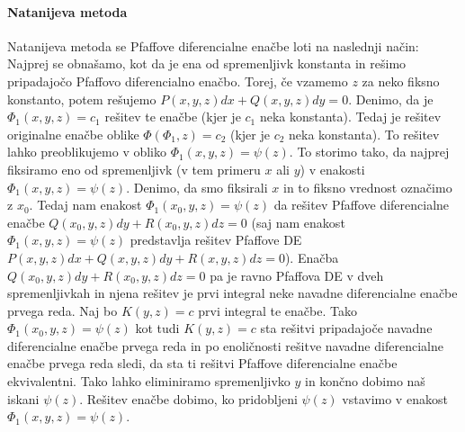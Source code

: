 \documentclass[a4paper, 10pt]{article}
\begin{document}
					\paragraph{Natanijeva metoda}
						Natanijeva metoda se Pfaffove diferencialne enačbe loti na naslednji način: Najprej se obnašamo, kot da je ena od spremenljivk konstanta in rešimo pripadajočo Pfaffovo diferencialno enačbo. Torej, če vzamemo $z$ za neko fiksno konstanto, potem rešujemo $P(x, y, z)dx + Q(x, y, z)dy = 0$. Denimo, da je $\Phi_1(x, y, z) = c_1$ rešitev te enačbe (kjer je $c_1$ neka konstanta). Tedaj je rešitev originalne enačbe oblike $\Phi(\Phi_1, z) = c_2$ (kjer je $c_2$ neka konstanta). To rešitev lahko preoblikujemo v obliko $\Phi_1(x, y, z) = \psi(z)$. To storimo tako, da najprej fiksiramo eno od spremenljivk (v tem primeru $x$ ali $y$) v enakosti $\Phi_1(x, y, z) = \psi(z)$. Denimo, da smo fiksirali $x$ in to fiksno vrednost označimo z $x_0$. Tedaj nam enakost $\Phi_1(x_0, y, z) = \psi(z)$ da rešitev Pfaffove diferencialne enačbe $Q(x_0, y, z)dy + R(x_0, y, z)dz = 0$ (saj nam enakost $\Phi_1(x, y, z) = \psi(z)$ predstavlja rešitev Pfaffove DE $P(x, y, z)dx + Q(x, y, z)dy + R(x, y, z)dz = 0$). Enačba $Q(x_0, y, z)dy + R(x_0, y, z)dz = 0$ pa je ravno Pfaffova DE v dveh spremenljivkah in njena rešitev je prvi integral neke navadne diferencialne enačbe prvega reda. Naj bo $K(y, z) = c$ prvi integral te enačbe. Tako $\Phi_1(x_0, y, z) = \psi(z)$ kot tudi $K(y, z) = c$ sta rešitvi pripadajoče navadne diferencialne enačbe prvega reda in po enoličnosti rešitve navadne diferencialne enačbe prvega reda sledi, da sta ti rešitvi Pfaffove diferencialne enačbe ekvivalentni. Tako lahko eliminiramo spremenljivko $y$ in končno dobimo naš iskani $\psi(z)$. Rešitev enačbe dobimo, ko pridobljeni $\psi(z)$ vstavimo v enakost $\Phi_1(x, y, z) = \psi(z)$.
						
\end{document}
